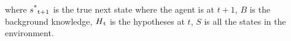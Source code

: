 where $s\textsuperscript{*}\textsubscript{t+1}$ is the true next state where the agent is at $t+1$, 
$B$ is the background knowledge, $H\textsubscript{t}$ is the hypotheses at $t$, $S$ is all the states in the environment.






